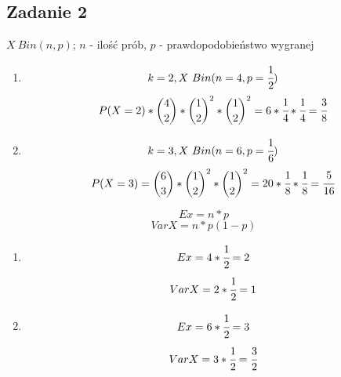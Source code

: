 \subsection{Zadanie 2}

$X ~ Bin(n, p)$; $n$ - ilość prób, $p$ - prawdopodobieństwo wygranej
\begin{enumerate}[label=(\alph*)]
\item
$$ k = 2, X ~ Bin(n = 4, p = \cfrac{1}{2}) $$
$$
P(X = 2) * {{4}\choose{2}} * {{1}\choose{2}}^2 * {{1}\choose{2}}^2 = 6 * \cfrac{1}{4} * \cfrac{1}{4} = \cfrac{3}{8}
$$

\item
$$ k = 3, X ~ Bin(n = 6, p = \cfrac{1}{6}) $$
$$
P(X = 3) = {{6}\choose{3}} * {{1}\choose{2}}^2 * {{1}\choose{2}}^2 = 20 * \cfrac{1}{8} * \cfrac{1}{8} = \cfrac{5}{16}
$$
\end{enumerate}

$$Ex = n * p$$
$$Var X = n * p(1 - p)$$

\begin{enumerate}[label=(\alph*)]
\item
$$ Ex = 4 * \cfrac{1}{2} = 2 $$
$$ Var X = 2 * \cfrac{1}{2} = 1 $$

\item
$$ Ex = 6 * \cfrac{1}{2} = 3$$
$$Var X = 3 * \cfrac{1}{2} = \cfrac{3}{2}$$
\end{enumerate}
